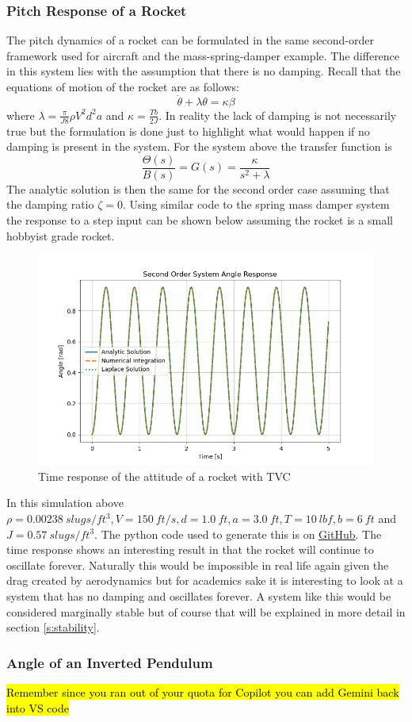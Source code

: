 \subsubsection{Pitch Response of a Rocket}\label{s:rocket_response}

The pitch dynamics of a rocket can be formulated in the same second-order framework used for aircraft and the mass-spring-damper example. The difference in this system lies with the assumption that there is no damping. Recall that the equations of motion of the rocket are as follows:
\begin{equation}
    \ddot{\theta} + \lambda \theta = \kappa \beta
\end{equation}
where $\lambda=\frac{\pi}{J8}\rho V^2 d^2 a$ and $\kappa=\frac{Tb}{2J}$. In reality the lack of damping is not necessarily true but the formulation is done just to highlight what would happen if no damping is present in the system. For the system above the transfer function is
\begin{equation}
  \frac{\Theta(s)}{B(s)} = G(s) = \frac{\kappa}{s^2+\lambda}
\end{equation}
The analytic solution is then the same for the second order case assuming that the damping ratio $\zeta=0$. Using similar code to the spring mass damper system the response to a step input can be shown below assuming the rocket is a small hobbyist grade rocket. 
\begin{figure}[H]
\centering
\includegraphics[width=0.8\linewidth]{Figures/rocket_response.png}
\caption{Time response of the attitude of a rocket with TVC}
\label{f:rocket_response}
\end{figure}
\noindent In this simulation above $\rho=0.00238~slugs/ft^3,V=150~ft/s,d=1.0~ft,a=3.0~ft,T=10~lbf,b=6~ft$ and $J=0.57~slugs/ft^3$. The python code used to generate this is on \href{https://github.com/cmontalvo251/Python/blob/master/controls/rocket.py}{GitHub}. The time response shows an interesting result in that the rocket will continue to oscillate forever. Naturally this would be impossible in real life again given the drag created by aerodynamics but for academics sake it is interesting to look at a system that has no damping and oscillates forever. A system like this would be considered marginally stable but of course that will be explained in more detail in section \ref{s:stability}.

\subsubsection{Angle of an Inverted Pendulum}

\hl{Remember since you ran out of your quota for Copilot you can add Gemini back into VS code}